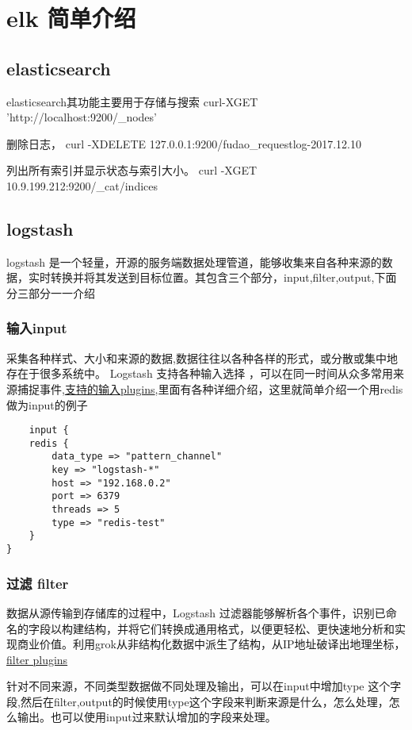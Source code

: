 \chapter{elk 简单介绍}
\section{elasticsearch}
elasticsearch其功能主要用于存储与搜索
curl-XGET 'http://localhost:9200/_nodes'

删除日志， curl -XDELETE 127.0.0.1:9200/fudao_requestlog-2017.12.10

列出所有索引并显示状态与索引大小。 curl -XGET 10.9.199.212:9200/_cat/indices 
\section{logstash}
logstash 是一个轻量，开源的服务端数据处理管道，能够收集来自各种来源的数据，实时转换并将其发送到目标位置。其包含三个部分，input,filter,output,下面分三部分一一介绍


\subsection{输入input}
采集各种样式、大小和来源的数据,数据往往以各种各样的形式，或分散或集中地存在于很多系统中。 Logstash 支持各种输入选择 ，可以在同一时间从众多常用来源捕捉事件,\href{https://www.elastic.co/guide/en/logstash/current/input-plugins.html}{支持的输入plugins},里面有各种详细介绍，这里就简单介绍一个用redis做为input的例子

\begin{lstlisting}
	input {
    redis {
        data_type => "pattern_channel"
        key => "logstash-*"
        host => "192.168.0.2"
        port => 6379
        threads => 5
        type => "redis-test"
    }
}

\end{lstlisting}

\subsection{过滤 filter}
数据从源传输到存储库的过程中，Logstash 过滤器能够解析各个事件，识别已命名的字段以构建结构，并将它们转换成通用格式，以便更轻松、更快速地分析和实现商业价值。利用grok从非结构化数据中派生了结构，从IP地址破译出地理坐标，\href{https://www.elastic.co/guide/en/logstash/current/filter-plugins.html}{filter plugins}

针对不同来源，不同类型数据做不同处理及输出，可以在input中增加type 这个字段,然后在filter,output的时候使用type这个字段来判断来源是什么，怎么处理，怎么输出。也可以使用input过来默认增加的字段来处理。

